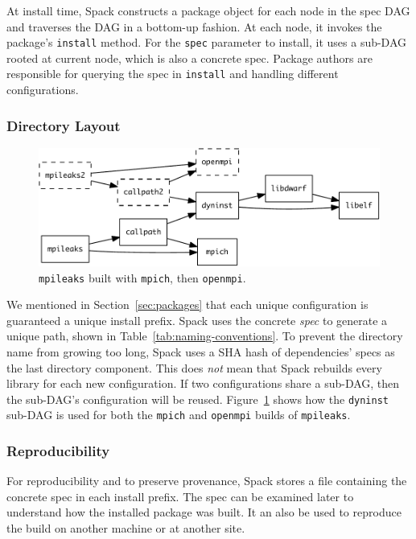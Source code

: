 At install time, Spack constructs a package object for each node in the spec DAG
and traverses the DAG in a bottom-up fashion.  At each node, it invokes the package's
{\tt install} method.  For the {\tt spec} parameter to install, it uses a sub-DAG
rooted at current node, which is also a concrete spec.  Package authors are
responsible for querying the spec in {\tt install} and handling different configurations.

\subsubsection{Directory Layout}\label{sec:directory-layout}
\begin{figure}\centering
   \includegraphics[width=\linewidth]{specs/rpaths.pdf}
   \caption{
       {\tt mpileaks} built with {\tt mpich}, then {\tt openmpi}.
       \label{fig:reuse}
   }
\end{figure}

We mentioned in Section~\ref{sec:packages} that each unique configuration is
guaranteed a unique install prefix. Spack uses the concrete {\it spec} 
to generate a unique path, shown in Table~\ref{tab:naming-conventions}.
To prevent the directory name from growing too long, Spack uses a SHA hash of
dependencies' specs as the last directory component.  This
does {\it not} mean that Spack rebuilds every library for each new configuration.
If two configurations share a sub-DAG, then the sub-DAG's configuration will
be reused.  Figure~\ref{fig:reuse} shows how the {\tt dyninst} sub-DAG is used for
both the {\tt mpich} and {\tt openmpi} builds of {\tt mpileaks}.


\subsubsection{Reproducibility}
For reproducibility and to preserve provenance, Spack stores a file containing
the concrete spec in each
install prefix. The spec can be examined later to understand how the installed
package was built.  It an also be used to reproduce the build on another machine
or at another site.

